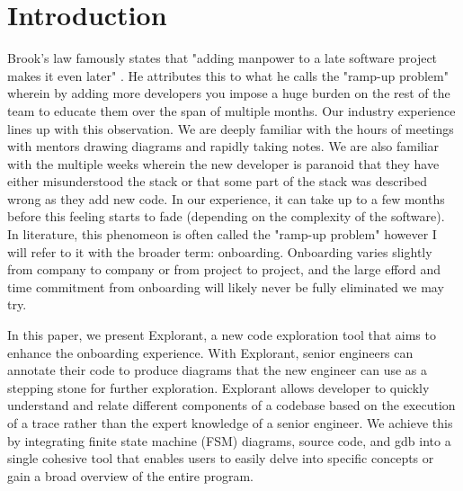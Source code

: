 \chapter{Introduction}




Brook's law famously states that "adding manpower to a late software project makes it even later" \cite{onboarding-brooks}. He attributes this to what he calls the "ramp-up problem" \cite{onboarding-ramp} wherein by adding more developers you impose a huge burden on the rest of the team to educate them over the span of multiple months. Our industry experience lines up with this observation. We are deeply familiar with the hours of meetings with mentors drawing diagrams and rapidly taking notes. We are also familiar with the multiple weeks wherein the new developer is paranoid that they have either misunderstood the stack or that some part of the stack was described wrong as they add new code. In our experience, it can take up to a few months before this feeling starts to fade (depending on the complexity of the software). In literature, this phenomeon is often called the "ramp-up problem" \cite{onboarding-ramp} however I will refer to it with the broader term: onboarding. Onboarding varies slightly from company to company or from project to project, and the large efford and time commitment from onboarding will likely never be fully eliminated we may try.

In this paper, we present Explorant, a new code exploration tool that aims to enhance the onboarding experience. With Explorant, senior engineers can annotate their code to produce diagrams that the new engineer can use as a stepping stone for further exploration. Explorant allows developer to quickly understand and relate different components of a codebase based on the execution of a trace rather than the expert knowledge of a senior engineer. We achieve this by integrating finite state machine (FSM) diagrams, source code, and gdb into a single cohesive tool that enables users to easily delve into specific concepts or gain a broad overview of the entire program.

